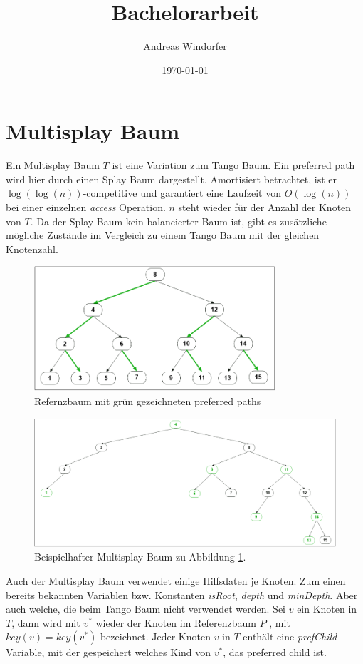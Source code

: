 \documentclass[a4paper,12pt]{article}
\title{Bachelorarbeit}
\author{
	Andreas Windorfer\\
}
\date{\today}
\begin{document}
\maketitle
\newpage

\newpage
\tableofcontents


\newpage


\section{Multisplay Baum}
Ein Multisplay Baum \cite{multisplay} $T$ ist eine Variation zum Tango Baum. Ein preferred path wird hier durch einen Splay Baum dargestellt. Amortisiert betrachtet, ist er $\log\left(\log\left(n\right)\right)$-competitive und garantiert eine Laufzeit von $O\left(\log \left(n\right)\right)$ bei einer einzelnen {\textit{access}} Operation. $n$ steht wieder für der Anzahl der Knoten von $T$. Da der Splay Baum kein balancierter Baum ist, gibt es zusätzliche mögliche Zustände im Vergleich zu einem Tango Baum mit der gleichen Knotenzahl.
\begin{figure}[h]
	\centering
	\includegraphics[width= 0.8\textwidth]{"Medien/Multisplay/referenzTree"}
	\caption {Refernzbaum mit grün gezeichneten preferred paths }
	\label{fig:referenzTree}
\end{figure} 
\begin{figure}[h]
	\centering
	\includegraphics[width= 1\textwidth]{"Medien/Multisplay/pfadRepresentation"}
	\caption {Beispielhafter Multisplay Baum zu Abbildung \ref{fig:referenzTree}.}
	\label{fig:pfadRepresentation}
\end{figure} 
Auch der Multisplay Baum verwendet einige Hilfsdaten je Knoten. Zum einen bereits bekannten Variablen bzw. Konstanten \textit{isRoot}, \textit{depth} und \textit{minDepth}. Aber auch welche, die beim Tango Baum nicht verwendet werden. Sei $v$ ein Knoten in $T$, dann wird mit $v^*$  wieder der Knoten im Referenzbaum $P$ ,  mit $\mathit{key}\left(v\right) = \mathit{key}\left(v^*\right)$ bezeichnet. Jeder Knoten $v$ in $T$ enthält eine \textit{prefChild} Variable, mit der gespeichert welches Kind von $v^*$, das preferred child ist. 
\end{document}
